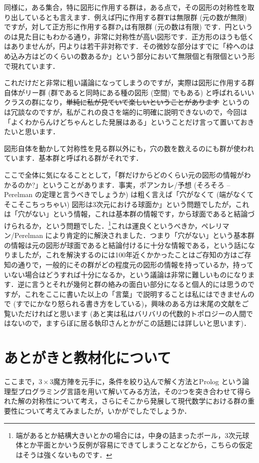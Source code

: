 \documentclass[11pt]{jsarticle}
\begin{document}
同様に，ある集合，特に図形に作用する群は，ある点で，その図形の対称性を取り出しているとも言えます．例えば円に作用する群$\mathbf{T}$は無限群 (元の数が無限) ですが，対して正方形に作用する群$\operatorname{\mathcal{D}}_4$は有限群 (元の数は有限) です．円というのは見た目にもわかる通り，非常に対称性が高い図形です．正方形のほうも低くはありませんが，円よりは若干非対称です．その微妙な部分はすでに「枠へのはめ込み方はどのくらいの数あるか」という部分において無限個と有限個という形で現れています．

これだけだと非常に粗い議論になってしまうのですが，実際は図形に作用する群自体がリー群 (群であると同時にある種の図形 (空間) でもある) と呼ばれるいいクラスの群になり，\sout{単純に私が見ていて楽しいということがあります} というのは冗談なのですが，私がこれの良さを端的に明確に説明できないので，今回は「よくわからんけどちゃんとした発展はある」ということだけ言って置いておきたいと思います．

図形自体を動かして対称性を見る群以外にも，穴の数を数えるのにも群が使われています．基本群と呼ばれる群がそれです．

ここで全体に気になることとして，「群だけからどのくらい元の図形の情報がわかるのか?」ということがあります．事実，ポアンカレ/\Poincare 予想 (そろそろ {\Poincare}--Perelman の定理と言うべきでしょうか) は粗く言えば「穴がなくて (端がなくてそこそこちっちゃい) 図形は3次元における球面か」という問題でしたが，これは「穴がない」という情報，これは基本群の情報です，から球面であると結論づけられるか，という問題でした．\footnote{端があるとか結構大きいとかの場合には，中身の詰まったボール，3次元球体とか平面とかいう反例が容易にできてしまうことなどから，こちらの仮定はそうは強くないものです．}これは運良くというべきか，ペレリマン/Perelman により肯定的に解決されました．つまり「穴がない」という基本群の情報は元の図形が球面であると結論付けるに十分な情報である，という話になりましたが，これを解決するのには100年近くかかったことはご存知の方はご存知の通りで，一般的にその群がどの程度元の図形の情報を持っているか，持っていない場合はどうすれば十分になるか，という議論は非常に難しいものになります．逆に言うとそれが幾何と群の絡みの面白い部分になると個人的には思うのですが，これをここに書いた以上の「言葉」で説明することは私にはできませんので (すでにかなり怒られる書き方をしている)，興味のある方は末尾の文献をご覧いただければと思います (あと実は私はバリバリの代数的トポロジーの人間ではないので，ますらぼに居る執印さんとかがこの話題には詳しいと思います)．

\section{あとがきと教材化について}
\label{okuda:ato}
ここまで，$3\times 3$魔方陣を元手に，条件を絞り込んで解く方法とProlog という論理型プログラミング言語を用いて解いてみる方法，その2つを突き合わせて得られた解の対称性について考え，さらにそこから発展して現代数学における群の重要性について考えてみましたが，いかがでしたでしょうか．
\end{document}
